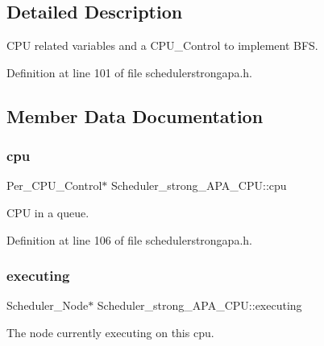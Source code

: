\subsection{Detailed Description}
C\+PU related variables and a C\+P\+U\+\_\+\+Control to implement B\+FS. 

Definition at line 101 of file schedulerstrongapa.\+h.



\subsection{Member Data Documentation}
\mbox{\label{structScheduler__strong__APA__CPU_ad8faf7fed335de658d1e37061c4cabe1}} 
\subsubsection{\texorpdfstring{cpu}{cpu}}
{\footnotesize\ttfamily Per\+\_\+\+C\+P\+U\+\_\+\+Control$\ast$ Scheduler\+\_\+strong\+\_\+\+A\+P\+A\+\_\+\+C\+P\+U\+::cpu}



C\+PU in a queue. 



Definition at line 106 of file schedulerstrongapa.\+h.

\mbox{\label{structScheduler__strong__APA__CPU_aecd8c97ce737bc7ad42bd8b77e84ad8b}} 
\subsubsection{\texorpdfstring{executing}{executing}}
{\footnotesize\ttfamily Scheduler\+\_\+\+Node$\ast$ Scheduler\+\_\+strong\+\_\+\+A\+P\+A\+\_\+\+C\+P\+U\+::executing}



The node currently executing on this cpu. 



